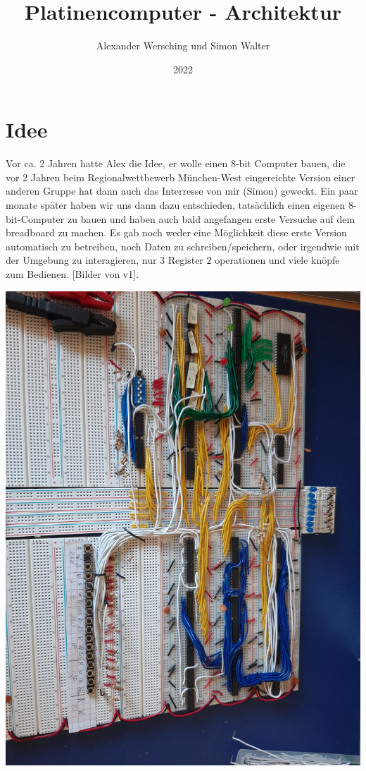 \documentclass{scrartcl}
\begin{document}
    \title{Platinencomputer - Architektur}
    \author{Alexander Wersching und Simon Walter}
    \date{2022}
    \maketitle

    \newpage
    \tableofcontents
    \newpage

    \section{Idee}


    Vor ca. 2 Jahren hatte Alex die Idee, er wolle einen 8-bit Computer bauen, die vor 2 Jahren beim Regionalwettbewerb München-West eingereichte Version einer anderen Gruppe hat dann auch das Interresse von mir (Simon) geweckt.
    Ein paar monate später haben wir uns dann dazu entschieden, tatsächlich einen eigenen 8-bit-Computer zu bauen und haben auch bald angefangen erste Versuche auf dem breadboard zu machen.
    Es gab noch weder eine Möglichkeit diese erste Version automatisch zu betreiben, noch Daten zu schreiben/speichern, oder irgendwie mit der Umgebung zu interagieren, nur 3 Register 2 operationen und viele knöpfe zum Bedienen. [Bilder von v1].

    \includegraphics{Computer_V01_Overview_01}
\end{document}
